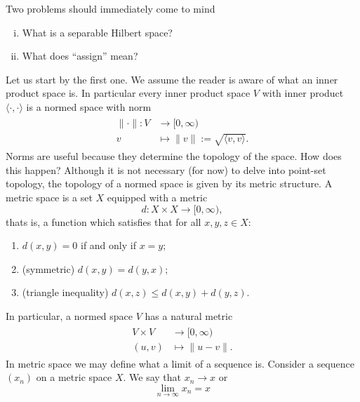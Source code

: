 \documentclass{article}
\begin{document}
Two problems should immediately come to mind
\begin{enumerate}[(i)]
\item What is a separable Hilbert space?
\item What does ``assign'' mean?
\end{enumerate}
Let us start by the first one. We assume the reader is aware of what an inner product space is. In particular every inner product space $V$ with inner product $\langle\cdot,\cdot\rangle$ is a normed space with norm
\begin{align}
\begin{split}
\|\cdot\|:V&\rightarrow [0,\infty) \\
v&\mapsto\|v\|:=\sqrt{\langle v,v\rangle}.
\end{split}
\end{align}
Norms are useful because they determine the topology of the space. How does this happen? Although it is not necessary (for now) to delve into point-set topology, the topology of a normed space is given by its metric structure. A metric space is a set $X$ equipped with a metric
\begin{equation}
d:X\times X\rightarrow [0,\infty),
\end{equation}
thats is, a function which satisfies that for all $x,y,z\in X$:
\begin{enumerate}
\item $d(x,y)=0$ if and only if $x=y$;
\item (symmetric) $d(x,y)=d(y,x)$;
\item (triangle inequality) $d(x,z)\leq d(x,y)+d(y,z)$.
\end{enumerate}
In particular, a normed space $V$ has a natural metric
\begin{align}
\begin{split}
V\times V &\rightarrow [0,\infty)\\
(u,v)&\mapsto \|u-v\|.
\end{split}
\end{align}
In metric space we may define what a limit of a sequence is. Consider a sequence $(x_n)$ on a metric space $X$. We say that $x_n\rightarrow x$ or
\begin{equation}
\lim_{n\rightarrow\infty}x_n=x
\end{equation}
\end{document}
